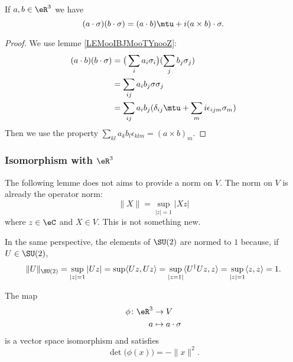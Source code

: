 \begin{lemma}       \label{LEMooLNCSooPHsVut}
	If \( a,b\in \eR^3\) we have
	\begin{equation}
		(a\cdot \sigma)(b\cdot \sigma)=(a\cdot b)\mtu+i(a\times b)\cdot \sigma.
	\end{equation}
\end{lemma}

\begin{proof}
	We use lemme \ref{LEMooIBJMooTYnooZ}:
	\begin{subequations}
		\begin{align}
			(a\cdot b)(b\cdot \sigma) & =\big( \sum_i a_i\sigma_i \big)(\sum_jb_j\sigma_j)              \\
			                          & =\sum_{ij}a_ib_j\sigma\sigma_j                                  \\
			                          & =\sum_{ij}a_ib_j(\delta_{ij}\mtu+\sum_mi\epsilon_{ijm}\sigma_m)
		\end{align}
	\end{subequations}
	Then we use the property \( \sum_{kl}a_kb_l\epsilon_{klm}=(a\times b)_m\).
\end{proof}

\subsubsection{Isomorphism with \( \eR^3\)}

The following lemme does not aims to provide a norm on \( V\). The norm on \( V\) is already the operator norm:
\begin{equation}
	\|X  \|=\sup_{| z |=1}| Xz |
\end{equation}
where \( z\in \eC\) and \( X\in V\). This is not something new.

In the same perspective, the elements of \( \SU(2)\) are normed to \( 1\) because, if \( U\in \SU(2)\),
\begin{equation}
	\| U \|_{\SU(2)}=\sup_{| z |=1}| Uz |=\sup\langle Uz, Uz\rangle =\sup_{| z=1 |}\langle U^{\dag}Uz, z\rangle =\sup_{| z |=1} \langle z, z\rangle=1.
\end{equation}

\begin{lemma}       \label{LEMooRFBTooIRDbEq}
	The map
	\begin{equation}
		\begin{aligned}
			\phi\colon \eR^3 & \to V                 \\
			a                & \mapsto a\cdot \sigma
		\end{aligned}
	\end{equation}
	is a vector space isomorphism and satisfies
	\begin{equation}
		\det\big( \phi(x) \big)=-\| x \|^2.
	\end{equation}
\end{lemma}

